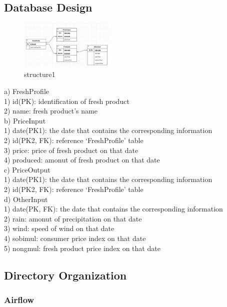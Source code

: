 \documentclass[conference]{IEEEtran}
\begin{document}
\subsection{Database Design}
\begin{figure}[!htbp]
\centering
    \includegraphics[width =4.5cm]{pictures/structure1.eps}
    \hfil
\caption{structure1}
\end{figure}
{a) FreshProfile\\
1) id(PK): identification of fresh product\\
2) name: fresh product’s name\\

b) PriceInput\\
1) date(PK1): the date that contains the corresponding information\\
2) id(PK2, FK): reference ‘FreshProfile’ table\\
3) price: price of fresh product on that date\\
4) produced: amonut of fresh product on that date\\

c) PriceOutput\\
1) date(PK1): the date that contains the corresponding information\\
2) id(PK2, FK): reference ‘FreshProfile’ table\\

d) OtherInput\\
1) date(PK, FK): the date that contains the corresponding information\\
2) rain: amonut of precipitation on that date\\
3) wind: speed of wind on that date\\
4) sobimul: consumer price index on that date\\
5) nongmul: fresh product price index on that date\\
}

\subsection{Directory Organization}
\subsubsection{Airflow}
\end{document}
